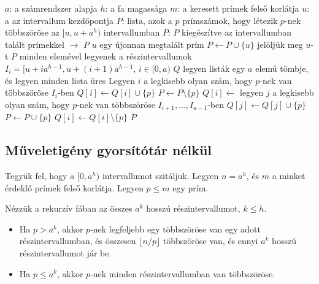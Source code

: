 \documentclass[12pt]{report}
\begin{document}
\begin{algorithm}
\caption{Az $[u, u+a^h)$ intervallum szitálása}
\label{alg:tree-factors}
\begin{algorithmic}[1]
\Require $a$: a számrendszer alapja
\Require $h$: a fa magassága
\Require $m$: a keresett prímek felső korlátja
\Require $u$: a az intervallum kezdőpontja
\Require $P$: lista, azok a $p$ prímszámok, hogy létezik $p$-nek többszöröse az $[u, u+a^h)$ intervallumban
\Ensure $P$: $P$ kiegészítve az intervallumban talált prímekkel
 $\rightarrow$ $P$
			\Comment $u$ egy újonnan megtalált prím
				\State $P \leftarrow P \cup \{u\}$
			\EndIf
		\EndIf
		\State jelöljük meg $u$-t $P$ minden elemével
	\Else
		\State legyenek a részintervallumok
			$I_i = [u+ia^{h-1}, u+(i+1)a^{h-1}$, $i \in [0, a)$
		\State $Q$ legyen listák egy $a$ elemű tömbje, és legyen minden lista üres
			\State Legyen $i$ a legkisebb olyan szám,
				hogy $p$-nek van többszöröse $I_i$-ben
			\State $Q[i] \leftarrow Q[i] \cup \{p\}$
			\State $P \leftarrow P \setminus \{p\}$
		\EndFor
			\State $Q[i] \leftarrow$
					\State legyen $j$ a legkisebb olyan szám,
					\State hogy $p$-nek van többszöröse $I_{i+1}, ..., I_{a-1}$-ben
					\State $Q[j] \leftarrow Q[j] \cup \{p\}$
				\Else
					\State $P \leftarrow P \cup \{p\}$
				\EndIf
				\State $Q[i] \leftarrow Q[i] \setminus \{p\}$
			\EndFor
		\EndFor
	\EndIf
	\State \Return $P$
\EndFunction
\end{algorithmic}
\end{algorithm}

\subsection{Műveletigény gyorsítótár nélkül}

Tegyük fel, hogy a $[0, a^h)$ intervallumot szitáljuk.
Legyen $n = a^h$, és $m$ a minket érdeklő prímek felső korlátja.
Legyen $p \le m$ egy prím.

Nézzük a rekurzív fában az összes $a^k$ hosszú részintervallumot,
$k \le h$.
\begin{itemize}
\item Ha $p > a^k$, akkor $p$-nek legfeljebb egy többszöröse van egy adott részintervallumban, és összesen $\lfloor n/p \rfloor$ többszöröse van,
és ennyi $a^k$ hosszú részintervallumot jár be.
\item Ha $p \le a^{k}$, akkor $p$-nek minden részintervallumban van többszöröse.
\end{itemize}
\end{document}
